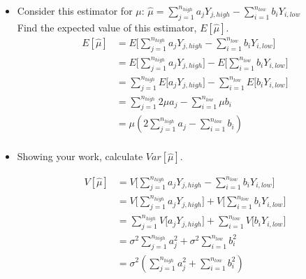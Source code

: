 \documentclass[10pt]{article}
\begin{document}
\begin{itemize}
\item[a)]  Consider this estimator for $\mu$: $ \hat{\mu} = \sum_{j=1}^{n_{high}} a_j Y_{j,high} - \sum_{i=1}^{n_{low}} b_iY_{i,low}$ \\

Find the expected value of this estimator, $E[\hat{\mu}]$. \\

\color{red}
\begin{align*}
E[\hat{\mu}] &= E\Big[\sum_{j=1}^{n_{high}} a_j Y_{j,high} - \sum_{i=1}^{n_{low}} b_iY_{i,low}]  \\
&= E\Big[\sum_{j=1}^{n_{high}} a_j Y_{j,high}] - E\Big[\sum_{i=1}^{n_{low}} b_iY_{i,low}]  \\
&= \sum_{j=1}^{n_{high}} E\Big[a_j Y_{j,high}] - \sum_{i=1}^{n_{low}} E\Big[b_iY_{i,low}]  \\
&= \sum_{j=1}^{n_{high}} 2\mu a_j  - \sum_{i=1}^{n_{low}}\mu b_i  \\
&= \mu(2\sum_{j=1}^{n_{high}}  a_j  - \sum_{i=1}^{n_{low}} b_i ) \\
\end{align*}


\color{black}
%
%

\item[bonus)] Showing your work, calculate $Var[\hat{\mu}]$.

\color{red}
\begin{align*}
V[\hat{\mu}] &= V\Big[\sum_{j=1}^{n_{high}} a_j Y_{j,high} - \sum_{i=1}^{n_{low}} b_iY_{i,low}]  \\
&= V\Big[\sum_{j=1}^{n_{high}} a_j Y_{j,high}] + V\Big[\sum_{i=1}^{n_{low}} b_iY_{i,low}]  \\
&= \sum_{j=1}^{n_{high}} V\Big[a_j Y_{j,high}] + \sum_{i=1}^{n_{low}} V\Big[b_iY_{i,low}]  \\
&= \sigma^2 \sum_{j=1}^{n_{high}} a_j^2  + \sigma^2 \sum_{i=1}^{n_{low}} b_i^2  \\
&= \sigma^2(\sum_{j=1}^{n_{high}}  a_j^2  + \sum_{i=1}^{n_{low}} b_i^2 ) \\
\end{align*}


\color{black}


%
%
\end{itemize}

\clearpage
\end{document}
